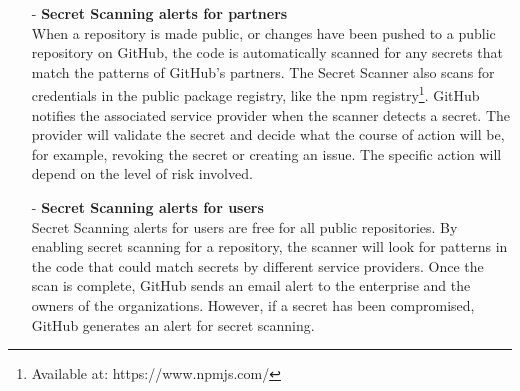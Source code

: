 \begin{itemize}
    \item [-] \textbf{Secret Scanning alerts for partners}\\
    When a repository is made public, or changes have been pushed to a public repository on GitHub, the code is automatically scanned for any secrets that match the patterns of GitHub's partners. The Secret Scanner also scans for credentials in the public package registry, like the npm registry\footnote{Available at: https://www.npmjs.com/}. GitHub notifies the associated service provider when the scanner detects a secret. The provider will validate the secret and decide what the course of action will be, for example, revoking the secret or creating an issue. The specific action will depend on the level of risk involved. 
    
    \item [-] \textbf{Secret Scanning alerts for users}\\
    Secret Scanning alerts for users are free for all public repositories. By enabling secret scanning for a repository, the scanner will look for patterns in the code that could match secrets by different service providers. Once the scan is complete, GitHub sends an email alert to the enterprise and the owners of the organizations. However, if a secret has been compromised, GitHub generates an alert for secret scanning. 
    
\end{itemize}
\newpage
